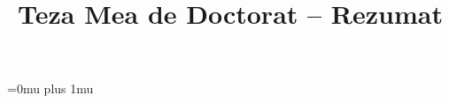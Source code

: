 \documentclass{template/thesis.cs.pub.ro}
\begin{document}



\title{Teza Mea de Doctorat -- Rezumat}

\begin{frontmatter} %



\setcounter{tocdepth}{1}


\end{frontmatter} %



\Urlmuskip=0mu plus 1mu\relax




\end{document}
